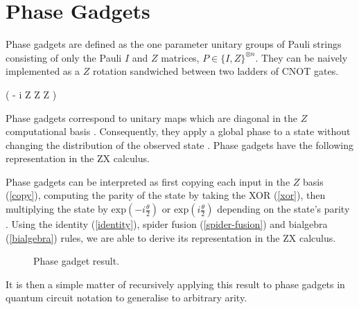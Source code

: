 \section{Phase Gadgets}
Phase gadgets are defined as the one parameter unitary groups of Pauli strings consisting of only the Pauli $I$ and $Z$ matrices, $P \in \{I, Z\}^{\otimes n}$. They can be naively implemented as a $Z$ rotation sandwiched between two ladders of CNOT gates.

{ \left( - i  Z \otimes Z \otimes Z \right)}

Phase gadgets correspond to unitary maps which are diagonal in the $Z$ computational basis \cite{Cowtan2020}. Consequently, they apply a global phase to a state without changing the distribution of the observed state \cite{Yeung2020}. Phase gadgets have the following representation in the ZX calculus.


Phase gadgets can be interpreted as first copying each input in the $Z$ basis (\ref{copy}), computing the parity of the state by taking the XOR (\ref{xor}), then multiplying the state by $\text{exp} \left(-i\frac{\theta}{2} \right)$ or $\text{exp} \left(i\frac{\theta}{2} \right)$ depending on the state's parity \cite{Yeung2020}. Using the identity (\ref{identity}), spider fusion (\ref{spider-fusion}) and bialgebra (\ref{bialgebra}) rules, we are able to derive its representation in the ZX calculus.

\begin{figure}[H]
    \centering
    \caption{Phase gadget result.}
    \label{phase-gadget-result}
\end{figure}

It is then a simple matter of recursively applying this result to phase gadgets in quantum circuit notation to generalise to arbitrary arity.

%
\label{phase-gadget-proof}

